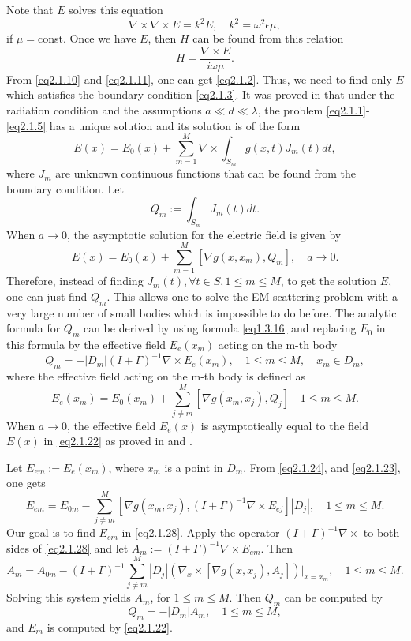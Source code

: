 \documentclass[12pt]{article}
\numberwithin{equation}{section}
\newcommand{\be}{\begin{equation}}
\newcommand{\ee}{\end{equation}}
\begin{document}
Note that $E$ solves this equation
\be \label{eq2.1.11}
    \nabla\times\nabla\times E=k^2 E, \quad k^2=\omega^2\epsilon \mu,
\ee
if $\mu=$const.
Once we have $E$, then $H$ can be found from this relation
\be \label{eq2.1.10}
    H=\frac{\nabla\times E}{i\omega\mu}.
\ee
From \eqref{eq2.1.10} and \eqref{eq2.1.11}, one can get \eqref{eq2.1.2}. Thus, we need to find only $E$ which satisfies the boundary condition \eqref{eq2.1.3}. It was proved in \cite{R620} that under the radiation condition and the assumptions $a \ll d \ll \lambda$, the problem \eqref{eq2.1.1}-\eqref{eq2.1.5} has a unique solution and its solution is of the form
\be \label{eq2.1.13}
    E(x)=E_0(x)+\sum_{m=1}^M \nabla\times \int_{S_m} g(x,t) J_m(t)dt,
\ee
 where $J_m$ are unknown continuous functions that can be found from the boundary condition.
 Let
\be \label{eq2.1.15}
    Q_m:=\int_{S_m}J_m(t)dt.
\ee
When $a \to 0$, the asymptotic solution for the electric field is given by
\be \label{eq2.1.22}
    E(x)=E_0(x)+\sum_{m=1}^M [\nabla g(x,x_m), Q_m], \quad a\to 0.
\ee
Therefore, instead of finding $J_m(t), \forall t \in S, 1 \le m \le M$, to get the solution $E$, one can just find $Q_m$. This allows one to solve the EM scattering problem with a very large number of small bodies which is impossible to do before. The analytic formula for $Q_m$ can be derived by using formula \eqref{eq1.3.16} and replacing $E_0$ in this formula by the effective field $E_{e}(x_m)$ acting on the m-th body
\be \label{eq2.1.24}
    Q_m=-|D_m|(I+\Gamma)^{-1} \nabla\times E_{e}(x_m), \quad 1 \le m \le M, \quad x_m \in D_m,
\ee
where the effective field acting on the m-th body is defined as
\be \label{eq2.1.23}
    E_e(x_m)=E_0(x_m)+\sum_{j\ne m}^M [\nabla g(x_m,x_j), Q_j]\quad 1 \le m \le M.
\ee
When $a \to 0$, the effective field $E_e(x)$ is asymptotically equal to the field $E(x)$ in \eqref{eq2.1.22} as proved in \cite{R620} and \cite{R652}.

Let $E_{em}:=E_{e}(x_m)$, where $x_m$ is a point in $D_m$. From \eqref{eq2.1.24}, and \eqref{eq2.1.23}, one gets
\be \label{eq2.1.28}
    E_{em}=E_{0m}-\sum_{j\ne m}^M [\nabla g(x_m,x_j), (I+\Gamma)^{-1}\nabla\times E_{ej}]|D_j|,\quad
       1 \le m \le M.
\ee
Our goal is to find $E_{em}$ in \eqref{eq2.1.28}. Apply the operator $(I+\Gamma)^{-1}\nabla \times$ to both sides of \eqref{eq2.1.28} and let $A_m:=(I+\Gamma)^{-1}\nabla \times E_{em}$. Then
\be \label{eq2.1.29}
    A_m=A_{0m}-(I+\Gamma)^{-1}\sum_{j\ne m}^M |D_j|\left(\nabla_x\times [\nabla g(x,x_j),A_j] \right) |_{x=x_m}, \quad
   1 \le m \le M.
\ee
Solving this system yields $A_m$, for $1 \le m \le M$. Then $Q_m$ can be computed by
\be \label{eq2.1.30}
    Q_m = -|D_m|A_m, \quad   1 \le m \le M,
\ee
and $E_m$ is computed by \eqref{eq2.1.22}.
\end{document}
